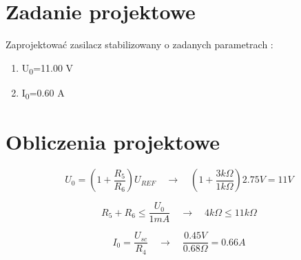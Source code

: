 \documentclass[a4paper,12pt]{article}
\begin{document}
\section{Zadanie projektowe}
Zaprojektować zasilacz stabilizowany o zadanych parametrach :
\begin{enumerate}
\item U\textsubscript{0}=11.00 V
\item I\textsubscript{0}=0.60 A
\end{enumerate}
\section{Obliczenia projektowe}

\begin{equation}
  U_0=(1+\frac{R_5}{R_6})U_{REF} \quad \to \quad (1+\frac{3k\Omega}{1k\Omega})2.75 V = 11 V
\end{equation}

\begin{equation}
  R_5+R_6 \leq \frac{U_0}{1mA} \quad \to \quad 4k\Omega \leq 11k\Omega 
\end{equation}

\begin{equation}
  I_0=\frac{U_{sc}}{R_4} \quad \to \quad \frac{0.45V}{0.68\Omega}=0.66 A      
\end{equation}

\end{document}
